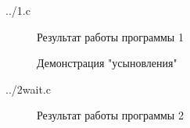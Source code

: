 \documentclass[a4paper,oneside,14pt]{extreport}
\begin{document}


\begin{lstinputlisting}[
	caption={Программа 1},
	label={list1},
	style={c},
	]{../1.c}
\end{lstinputlisting}

\newpage
\begin{figure}[h]
	\caption{Результат работы программы 1}
	\label{1.1png}
\end{figure}

\begin{figure}[h]
	\caption{Демонстрация "усыновления"}
	\label{1.2png}
\end{figure}

\newpage
\begin{lstinputlisting}[
	caption={Программа 2},
	label={list2},
	style={c},
	]{../2wait.c}
\end{lstinputlisting}

\begin{figure}[h]
	\caption{Результат работы программы 2}
	\label{2.1png}
\end{figure}
\end{document}
